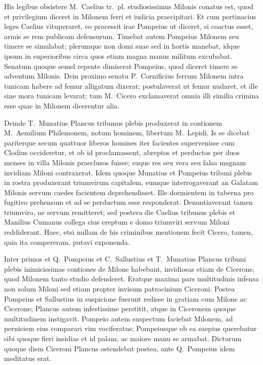 His legibus obsistere M.~Caelius tr.~pl. studiosissimus Milonis conatus est, quod et privilegium diceret in Milonem ferri et iudicia praecipitari. Et cum pertinacius leges Caelius vituperaret, eo processit irae Pompeius ut diceret, si coactus esset, armis se rem publicam defensurum. Timebat autem Pompeius Milonem seu timere se simulabat; plerumque non domi suae sed in hortis manebat, idque ipsum in superioribus circa quos etiam magna manus militum excubabat. Senatum quoque semel repente dimiserat Pompeius, quod diceret timere se adventum Milonis. Dein proximo senatu P.~Cornificius ferrum Milonem intra tunicam habere ad femur alligatum dixerat; postulaverat ut femur nudaret, et ille sine mora tunicam levarat; tum M.~Cicero exclamaverat omnia illi similia crimina esse quae in Milonem dicerentur alia.

Deinde T.~Munatius Plancus tribunus plebis produxerat in contionem M.~Aemilium Philemonem, notum hominem, libertum M.~Lepidi. Is se dicebat pariterque secum quattuor liberos homines iter facientes supervenisse cum Clodius occideretur, et ob id proclamassent, abreptos et perductos per duos menses in villa Milonis praeclusos fuisse; eaque res seu vera seu falsa magnam invidiam Miloni contraxerat. Idem quoque Munatius et Pompeius tribuni plebis in rostra produxerant triumvirum capitalem, eumque interrogaverant an Galatam Milonis servum caedes facientem deprehendisset. Ille dormientem in taberna pro fugitivo prehensum et ad se perductum esse responderat. Denuntiaverant tamen triumviro, ne servum remitteret; sed postera die Caelius tribunus plebis et Manilius Cumanus collega eius ereptum e domo triumviri servum Miloni reddiderant. Haec, etsi nullam de his criminibus mentionem fecit Cicero, tamen, quia ita compereram, putavi exponenda. 

Inter primos et Q.~Pompeius et C.~Sallustius et T.~Munatius Plancus tribuni plebis inimicissimas contiones de Milone habebant, invidiosas etiam de Cicerone, quod Milonem tanto studio defenderet. Eratque maxima pars multitudinis infensa non solum Miloni sed etiam propter invisum patrocinium Ciceroni. Postea Pompeius et Sallustius in suspicione fuerunt redisse in gratiam cum Milone ac Cicerone; Plancus autem infestissime perstitit, atque in Ciceronem quoque multitudinem instigavit. Pompeio autem suspectum faciebat Milonem, ad perniciem eius comparari vim vociferatus; Pompeiusque ob ea saepius querebatur sibi quoque fieri insidias et id palam, ac maiore manu se armabat. Dicturum quoque diem Ciceroni Plancus ostendebat postea, ante Q.~Pompeius idem meditatus erat. 

